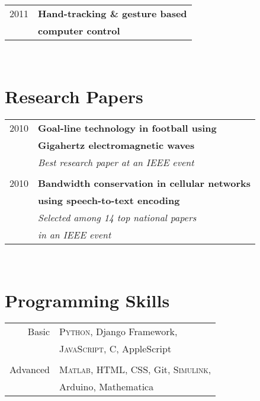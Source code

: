 \documentclass[10pt]{article} %
\begin{document}
{\begin{minipage}[t]{0.44\textwidth}
\begin{tabular}{rl}
2011	 & \textbf{Hand-tracking \& gesture based}\\
& \textbf{computer control}\\

\end{tabular}\\[10pt]


\section{Research Papers} 

\begin{tabular}{rl}
2010	 & \textbf{Goal-line technology in football using}\\
& \textbf{Gigahertz electromagnetic waves}\\
& \textit{Best research paper at an IEEE event}\\ \\


2010	 & \textbf{Bandwidth conservation in cellular networks}\\
& \textbf{using speech-to-text encoding}\\
& \textit{Selected among 14 top national papers}\\
& \textit{in an IEEE event}\\
\end{tabular}\\[10pt]


\section{Programming Skills} 

\begin{tabular}{rl}
Basic
& \textsc{Python}, Django Framework, \\ 
& \textsc{JavaScript}, C, AppleScript\\ \\
Advanced
& \textsc{Matlab}, \textsc{HTML}, \textsc{CSS}, Git, \textsc{Simulink}, \\
& Arduino, Mathematica \\
\end{tabular}
\\ 


\end{minipage}}
\end{document}
